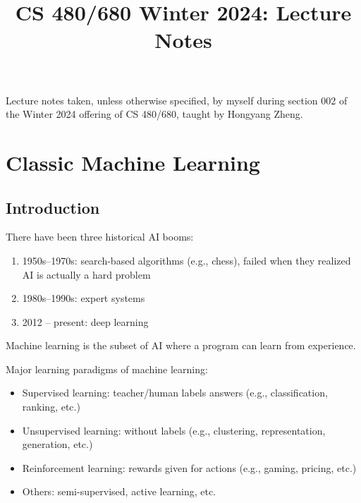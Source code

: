 \documentclass[class=cs480,notes,tikz]{agony}
\title{CS 480/680 Winter 2024: Lecture Notes}
\begin{document}
\renewcommand{\contentsname}{CS 480/680 Winter 2024:\\{\huge Lecture Notes}}
\thispagestyle{firstpage}
\tableofcontents

Lecture notes taken, unless otherwise specified,
by myself during section 002 of the Winter 2024 offering of CS 480/680,
taught by Hongyang Zheng.

\begin{multicols}{2}
  \listoflecture
\end{multicols}

\chapter{Classic Machine Learning}

\section{Introduction}

There have been three historical AI booms:
\begin{enumerate}[1.,nosep]
  \item 1950s--1970s: search-based algorithms (e.g., chess),
        failed when they realized AI is actually a hard problem
  \item 1980s--1990s: expert systems
  \item 2012 -- present: deep learning
\end{enumerate}

Machine learning is the subset of AI where a program can learn from experience.

Major learning paradigms of machine learning:
\begin{itemize}[nosep]
  \item Supervised learning: teacher/human labels answers (e.g., classification, ranking, etc.)
  \item Unsupervised learning: without labels (e.g., clustering, representation, generation, etc.)
  \item Reinforcement learning: rewards given for actions (e.g., gaming, pricing, etc.)
  \item Others: semi-supervised, active learning, etc.
\end{itemize}
\end{document}
